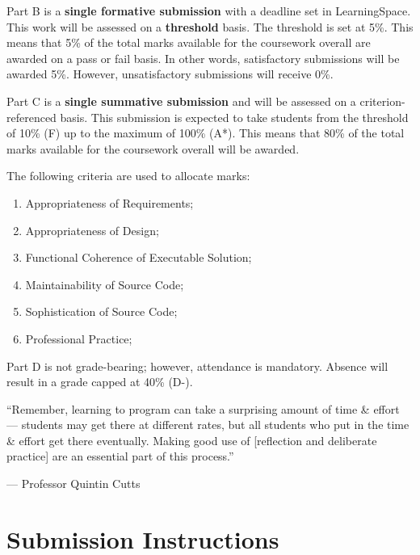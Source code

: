 \documentclass{../fal_assignment}
\begin{document}
Part B is a \textbf{single formative submission} with a deadline set in LearningSpace. This work will be assessed on a \textbf{threshold} basis. The threshold is set at 5\%. This means that 5\% of the total marks available for the coursework overall are awarded on a pass or fail basis. In other words, satisfactory submissions will be awarded 5\%. However, unsatisfactory submissions will receive 0\%.

Part C is a \textbf{single summative submission} and will be assessed on a criterion-referenced basis. This submission is expected to take students from the threshold of 10\% (F) up to the maximum of 100\% (A*). This means that 80\% of the total marks available for the coursework overall will be awarded.

The following criteria are used to allocate marks:

\begin{enumerate}[label=(\alph*)]
	\item Appropriateness of Requirements;
	\item Appropriateness of Design;
	\item Functional Coherence of Executable Solution;
	\item Maintainability of Source Code;
	\item Sophistication of Source Code;
	\item Professional Practice;
\end{enumerate}

Part D is not grade-bearing; however, attendance is mandatory. Absence will result in a grade capped at 40\% (D-).


\begin{marginquote}
    ``Remember, learning to program can take a surprising amount of time \& effort --- students may get there at different rates, but all students who put in the time \& effort get there eventually. Making good use of [reflection and deliberate practice] are an essential part of this process.''
    
    --- Professor Quintin Cutts
\end{marginquote}
\section*{Submission Instructions}
\end{document}

